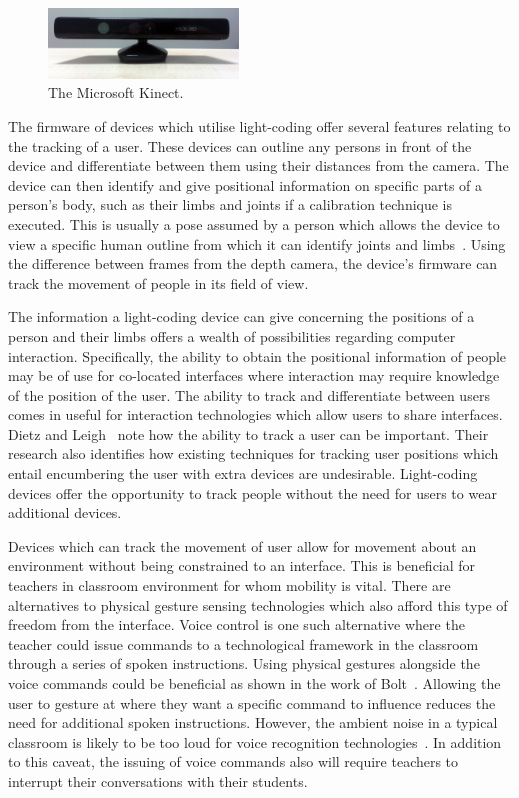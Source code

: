 \documentclass[link]{IWCOMP}
\begin{document}
\begin{figure}[h]
   \centering
   \includegraphics[width=0.45\textwidth]{figures/kinect.png}
   \caption{The Microsoft Kinect.}
   \label{fig:kinect}
\end{figure}

The firmware of devices which utilise light-coding offer several features relating to the tracking of a user.
These devices can outline any persons in front of the device and differentiate between them using their distances from the camera.
The device can then identify and give positional information on specific parts of a person's body, such as their limbs and joints if a calibration technique is executed.
This is usually a pose assumed by a person which allows the device to view a specific human outline from which it can identify joints and limbs~\cite{Xia2011}.
Using the difference between frames from the depth camera, the device's firmware can track the movement of people in its field of view.

The information a light-coding device can give concerning the positions of a person and their limbs offers a wealth of possibilities regarding computer interaction.
Specifically, the ability to obtain the positional information of people may be of use for co-located interfaces where interaction may require knowledge of the position of the user.
The ability to track and differentiate between users comes in useful for interaction technologies which allow users to share interfaces.
Dietz and Leigh~\cite{Dietz2001} note how the ability to track a user can be important.
Their research also identifies how existing techniques for tracking user positions which entail encumbering the user with extra devices are undesirable.
Light-coding devices offer the opportunity to track people without the need for users to wear additional devices.

Devices which can track the movement of user allow for movement about an environment without being constrained to an interface.
This is beneficial for teachers in classroom environment for whom mobility is vital.
There are alternatives to physical gesture sensing technologies which also afford this type of freedom from the interface.
Voice control is one such alternative where the teacher could issue commands to a technological framework in the classroom through a series of spoken instructions.
Using physical gestures alongside the voice commands could be beneficial as shown in the work of Bolt~\citeyearpar{Bolt1980}.
Allowing the user to gesture at where they want a specific command to influence reduces the need for additional spoken instructions.
However, the ambient noise in a typical classroom is likely to be too loud for voice recognition technologies~\cite{Cavalier1996,Goette1998,OHare1999}.
In addition to this caveat, the issuing of voice commands also will require teachers to interrupt their conversations with their students.
\end{document}
